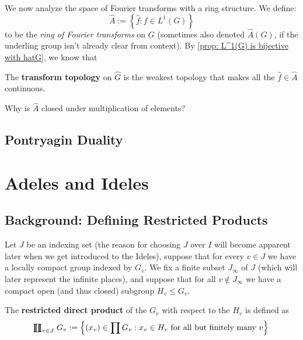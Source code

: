 \documentclass[11pt, x11names]{book}
\newcommand{\set}[1]{\left\{ #1 \right\}}
\newcommand{\rprod}{
    \mathrel{\ooalign{\hidewidth $\prod$ \hidewidth \cr $\coprod$}}
}
\renewcommand{\hat}{\widehat}
\begin{document}
We now analyze the space of Fourier transforms with a ring structure. We define:
\begin{equation*}
    \hat{A} := \set{\hat{f} : f \in L^1(G)}
\end{equation*}
to be the \textit{ring of Fourier transforms} on $G$ (sometimes also denoted $\hat{A}(G)$, if the underling group isn't already clear from context). By \ref{prop: L^1(G) is bijective with hatG}, we know that 
\begin{defn}
    The \textbf{transform topology} on $\hat{G}$ is the weakest topology that makes all the $\hat{f} \in \hat{A}$ continuous.
\end{defn}
\begin{sanitycheck}
    Why is $\hat{A}$ closed under multiplication of elements?
\end{sanitycheck}



\subsection{Pontryagin Duality}
\label{subsection: Pontryagin Duality}


\newpage
\section{Adeles and Ideles}
\label{section: Adeles&Ideles}


\subsection{Background: Defining Restricted Products}
\label{subsection: Restricted Products Def}
Let $J$ be an indexing set (the reason for choosing $J$ over $I$ will become apparent
later when we get introduced to the Ideles), suppose that for every $v \in J$ we have 
a locally compact group indexed by $G_v$. We fix a finite subset $J_\infty$ of $J$ (which
will later represent the infinite places), and suppose that for all $v \notin J_\infty$
we have a compact open (and thus closed) subgroup $H_v \leq G_v$.

\begin{defn}
The \textbf{restricted direct product} of the $G_v$ with respect to the $H_v$ is defined as 
\begin{equation*}
    \rprod_{v \in J} G_v := \set{(x_v) \in \prod G_v : x_v \in H_v \text{ for all but finitely many } v}
\end{equation*}
\end{defn}
\end{document}
